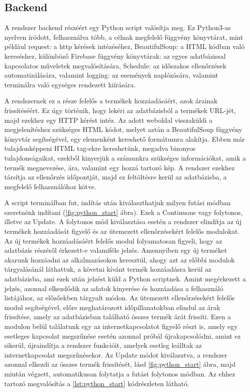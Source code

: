 \subsection{Backend}

A rendszer backend részéért egy Python script valósítja meg. Ez Python3-as nyelven íródott, felhasználva több, a célnak megfelelő függvény könyvtárat, mint például request: a http kérések intézéséhez, BeautifulSoup: a HTML kódban való kereséshez, különböző Firebase függvény könyvtárak: az egyes adatbázissal kapcsolatos műveletek megvalósítására, Schedule: az időszakos ellenőrzések automatizálására, valamint logging: az események naplózására, valamint terminálra való egységes rendezett kiírására.

A rendszernek ez a része felelős a termékek hozzáadásáért, azok árainak frissítéséért. Ez úgy történik, hogy lekéri az adatbázisból a termékek URL-jét, majd ezekhez egy HTTP kérést intéz. Az adott weboldal visszaküldi a megjelenítéshez szükséges HTML kódot, melyet aztán a BeautifulSoup függvény könyvtár segítségével, egy elemenként kereshető formátumra alakítja. Ebben már tulajdonképpeni HTML tag-ekre kereshetünk, megadva bizonyos tulajdonságaikat, ezekből kinyerjük a számunkra szükséges információkat, amik a termék megnevezése, ára, valamint egy hozzá tartozó kép. A rendszer ezekhez társítja az ellenőrzés időpontját, majd ez feltöltésre kerül az adatbázisba, a megfelelő felhasználóhoz kötve. 

A script terminálban fut, indítás után kiválaszthatjuk milyen futási módban szeretnénk indítani (\ref{fig:python_start} ábra). Ezek a Continuous vagy folytonos, illetve az Update. A folytonos mód kiválasztása esetén a rendszer elindítja az új termékek hozzáadását figyelő és az ütemezett ellenőrzésekért felelős modulokat. Az új termékek hozzáadásáért felelős modul folyamatosan figyeli, hogy az adatbázis részéről érkezett-e valamiféle jelzés. Amennyiben egy új terméket akarunk hozzáadni az alkalmazásokon keresztül, ahogy azt az előbbi modulok tárgyalásánál láthattuk, a követni kívánt termék hozzáadásra kerül az adatbázisba, ami ezek után jelzést küld a Python scriptnek. Amint megérkezett a jelzés, azonnal elkezdődik az adatok kinyerése és hozzáadása a felhasználó listájához, az előzőekben tárgyalt módon. Az ütemezett ellenőrzésekért felelős modul segítségével, előre meghatározott időpillanatokban elindul az árak frissítése, amely az adatbázisban található összes termék árát frissíti. Ezen a modulon belül találatunk egy az internetkapcsolatot figyelő részt is, amely egy esetleges kapcsolat megszűnése esetén azonnal próbál újrakapcsolódni, amint ez sikerül, újraindítja a rendszer funkcióit, amelyek esetleg leálltak az internetkapcsolat megszűnésekor. Az Update módot kiválasztva, a rendszer azonnal elkezdi az összes termék frissítését, lásd \ref{fig:python_start} ábra, majd miután végzett, automatikusan folytatja a futást folytonos módban. Az ehhez tartozó megvalósítás a \ref{lst:python_start} kódrészleten látható.

